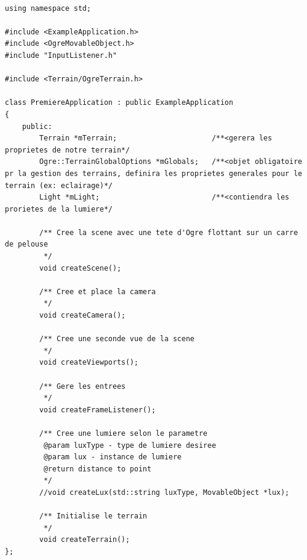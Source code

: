 \begin{lstlisting}[caption={PremiereApplication.h}]

using namespace std;

#include <ExampleApplication.h>
#include <OgreMovableObject.h>
#include "InputListener.h"

#include <Terrain/OgreTerrain.h>

class PremiereApplication : public ExampleApplication
{    
    public:
        Terrain *mTerrain;                      /**<gerera les proprietes de notre terrain*/
        Ogre::TerrainGlobalOptions *mGlobals;   /**<objet obligatoire pr la gestion des terrains, definira les proprietes generales pour le terrain (ex: eclairage)*/
        Light *mLight;                          /**<contiendra les prorietes de la lumiere*/
        
        /** Cree la scene avec une tete d'Ogre flottant sur un carre de pelouse
         */
        void createScene();
        
        /** Cree et place la camera
         */
        void createCamera();
        
        /** Cree une seconde vue de la scene
         */
        void createViewports();

        /** Gere les entrees 
         */
        void createFrameListener();
        
        /** Cree une lumiere selon le parametre
         @param luxType - type de lumiere desiree 
         @param lux - instance de lumiere 
         @return distance to point
         */
        //void createLux(std::string luxType, MovableObject *lux);
        
        /** Initialise le terrain
         */
        void createTerrain();
};
\end{lstlisting}













